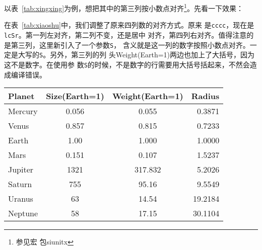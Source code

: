 以表~\ref{tab:xingxing}为例，想把其中的第三列按小数点对齐\footnote{参见宏
  包siunitx}。先看一下效果：

在表~\ref{tab:xiaoshu}中，我们调整了原来四列数的对齐方式。原来
是\texttt{cccc}，现在是\texttt{lcSr}。第一列左对齐，第二列不变，还是居中
对齐，第四列右对齐。值得注意的是第三列，这里新引入了一个参数\texttt{S}，
含义就是这一列的数字按照小数点对齐。一定是大写的\texttt{S}。另外，第三列的列
头Weight(Earth=1)两边也加上了大括号，因为这不是数字。在使用参
数\texttt{S}的时候，不是数字的行需要用大括号括起来，不然会造成编译错误。

\begin{table}[htbp]
  \centering
  \vspace{0.2cm}
  \wuhao
  \begin{tabular}{lcSr}
    \toprule
    Planet  & Size(Earth=1) & {Weight(Earth=1)} & Radius  \\
    \midrule
    Mercury & 0.056         & 0.055           & 0.3871  \\
    Venus   & 0.857         & 0.815           & 0.7233  \\
    Earth   & 1.00          & 1.000           & 1.0000  \\
    Mars    & 0.151         & 0.107           & 1.5237  \\
    Jupiter & 1321          & 317.832         & 5.2026  \\
    Saturn  & 755           & 95.16           & 9.5549  \\
    Uranus  & 63            & 14.54           & 19.2184 \\
    Neptune & 58            & 17.15           & 30.1104 \\
    \bottomrule
  \end{tabular}
\end{table}

